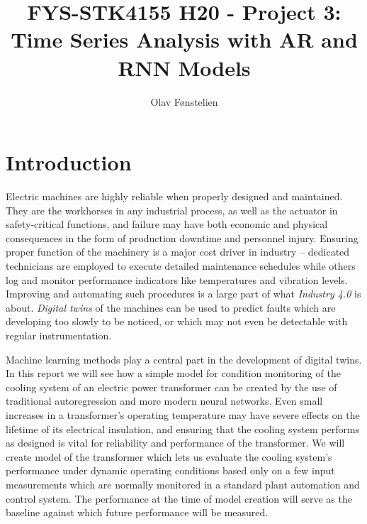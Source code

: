 \documentclass[]{article}
\title{FYS-STK4155 H20 - Project 3:\\Time Series Analysis with AR and RNN Models}
\author{Olav Fønstelien}
\begin{document}
\maketitle

\begin{abstract}

\end{abstract}

\section{Introduction} \label{sec:intro}


Electric machines are highly reliable when properly designed and maintained. They are the workhorses in any industrial process, as well as the actuator in safety-critical functions, and failure may have both economic and physical consequences in the form of production downtime and personnel injury. Ensuring proper function of the machinery is a major cost driver in industry -- dedicated technicians are employed to execute detailed maintenance schedules while others log and monitor performance indicators like temperatures and vibration levels. Improving and automating such procedures is a large part of what \textit{Industry 4.0} is about. \textit{Digital twins} of the machines can be used to predict faults which are developing too slowly to be noticed, or which may not even be detectable with regular instrumentation. 

Machine learning methods play a central part in the development of digital twins. In this report we will see how a simple model for condition monitoring of the cooling system of an electric power transformer can be created by the use of traditional autoregression and more modern neural networks. Even small increases in a transformer's operating temperature may have severe effects on the lifetime of its electrical insulation, and ensuring that the cooling system performs as designed is vital for reliability and performance of the transformer. We will create model of the transformer which lets us evaluate the cooling system's performance under dynamic operating conditions based only on a few input measurements which are normally monitored in a standard plant automation and control system. The performance at the time of model creation will serve as the baseline against which future performance will be measured.
\end{document}
